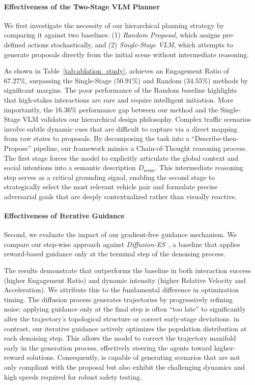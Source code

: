 \paragraph{Effectiveness of the Two-Stage VLM Planner}

We first investigate the necessity of our hierarchical planning strategy by comparing it against two baselines: (1) \textit{Random Proposal}, which assigns pre-defined actions stochastically, and (2) \textit{Single-Stage VLM}, which attempts to generate proposals directly from the initial scene without intermediate reasoning.

As shown in Table~\ref{tab:ablation_study}, \our achieves an Engagement Ratio of $67.27\%$, surpassing the Single-Stage ($50.91\%$) and Random ($34.55\%$) methods by significant margins. The poor performance of the Random baseline highlights that high-stakes interactions are rare and require intelligent initiation. More importantly, the 16.36\% performance gap between our method and the Single-Stage VLM validates our hierarchical design philosophy. Complex traffic scenarios involve subtle dynamic cues that are difficult to capture via a direct mapping from raw states to proposals. By decomposing the task into a ``Describe-then-Propose'' pipeline, our framework mimics a Chain-of-Thought reasoning process. The first stage forces the model to explicitly articulate the global context and social intentions into a semantic description $D_{\text{scene}}$. This intermediate reasoning step serves as a critical grounding signal, enabling the second stage to strategically select the most relevant vehicle pair and formulate precise adversarial goals that are deeply contextualized rather than visually reactive.

\paragraph{Effectiveness of Iterative Guidance}

Second, we evaluate the impact of our gradient-free guidance mechanism. We compare our step-wise approach against \textit{Diffusion-ES}~\citep{yang2024diffusion}, a baseline that applies reward-based guidance only at the terminal step of the denoising process.

The results demonstrate that \our outperforms the baseline in both interaction success (higher Engagement Ratio) and dynamic intensity (higher Relative Velocity and Acceleration). We attribute this to the fundamental difference in optimization timing. The diffusion process generates trajectories by progressively refining noise; applying guidance only at the final step is often ``too late'' to significantly alter the trajectory's topological structure or correct early-stage deviations. in contrast, our iterative guidance actively optimizes the population distribution at each denoising step. This allows the model to correct the trajectory manifold early in the generation process, effectively steering the agents toward higher-reward solutions. Consequently, \our is capable of generating scenarios that are not only compliant with the proposal but also exhibit the challenging dynamics and high speeds required for robust safety testing.

